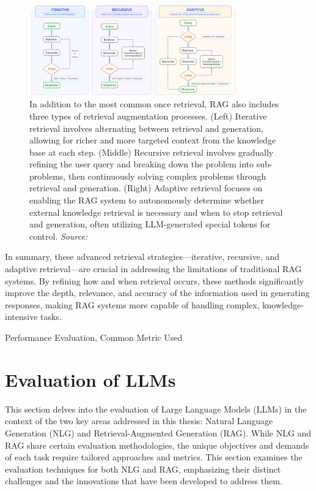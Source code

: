 \begin{figure}[h]
    \centering
    \includegraphics[width=0.8\textwidth]{images/llms/augmentation-process.png}
    \caption{In addition to the most common once retrieval, RAG also includes three types of retrieval augmentation processes. (Left) Iterative retrieval involves alternating between retrieval and generation, allowing for richer and more targeted context from the knowledge base at each step. (Middle) Recursive retrieval involves gradually refining the user query and breaking down the problem into sub-problems, then continuously solving complex problems through retrieval and generation. (Right) Adaptive retrieval focuses on enabling the RAG system to autonomously determine whether external knowledge retrieval is necessary and when to stop retrieval and generation, often utilizing LLM-generated special tokens for control. \textit{Source:} \cite{gao2023retrieval}}
    \label{fig:rag_augmentation}
\end{figure}

In summary, these advanced retrieval strategies—iterative, recursive, and adaptive retrieval—are crucial in addressing the limitations of traditional RAG systems. By refining how and when retrieval occurs, these methods significantly improve the depth, relevance, and accuracy of the information used in generating responses, making RAG systems more capable of handling complex, knowledge-intensive tasks.


Performance Evaluation, Common Metric Used

\section{Evaluation of LLMs}


This section delves into the evaluation of Large Language Models (LLMs) in the context of the two key areas addressed in this thesis: Natural Language Generation (NLG) and Retrieval-Augmented Generation (RAG). While NLG and RAG share certain evaluation methodologies, the unique objectives and demands of each task require tailored approaches and metrics. This section examines the evaluation techniques for both NLG and RAG, emphasizing their distinct challenges and the innovations that have been developed to address them.

